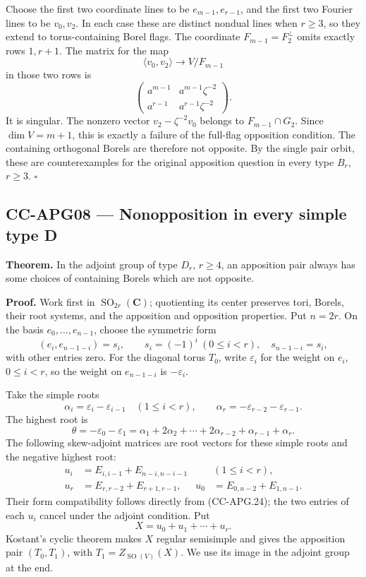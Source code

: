 \documentclass[11pt,a4paper]{article}
\theoremstyle{definition}\newtheorem{definition}[theorem]{Definition}
\theoremstyle{remark}\newtheorem{remark}[theorem]{Remark}
\begin{document}
Choose the first two coordinate lines to be \(e_{m-1},e_{r-1}\), and the
first two Fourier lines to be \(v_0,v_2\). In each case these are
distinct nondual lines when \(r\geq3\), so they extend to
torus-containing Borel flags. The coordinate \(F_{m-1}=F_2^\perp\) omits
exactly rows \(1,r+1\). The matrix for the map \[
 \langle v_0,v_2\rangle\longrightarrow V/F_{m-1}
\] in those two rows is \[
 \begin{pmatrix}
 a^{m-1}&a^{m-1}\zeta^{-2}\\
 a^{r-1}&a^{r-1}\zeta^{-2}
 \end{pmatrix}.
\] It is singular. The nonzero vector \(v_2-\zeta^{-2}v_0\) belongs to
\(F_{m-1}\cap G_2\). Since \(\dim V=m+1\), this is exactly a failure of
the full-flag opposition condition. The containing orthogonal Borels are
therefore not opposite. By the single pair orbit, these are
counterexamples for the original apposition question in every type
\(B_r\), \(r\geq3\). \(\square\)

\subsection{CC-APG08 --- Nonopposition in every simple type
D}\label{cc-apg08-nonopposition-in-every-simple-type-d}

\textbf{Theorem.} In the adjoint group of type \(D_r\), \(r\geq4\), an
apposition pair always has some choices of containing Borels which are
not opposite.

\textbf{Proof.} Work first in \(\operatorname{SO}_{2r}(\mathbf C)\);
quotienting its center preserves tori, Borels, their root systems, and
the apposition and opposition properties. Put \(n=2r\). On the basis
\(e_0,\ldots,e_{n-1}\), choose the symmetric form \[
 (e_i,e_{n-1-i})=s_i,\qquad
 s_i=(-1)^i\ (0\leq i<r),\quad
 s_{n-1-i}=s_i,
 \tag{CC-APG.24}
\] with other entries zero. For the diagonal torus \(T_0\), write
\(\varepsilon_i\) for the weight on \(e_i\), \(0\leq i<r\), so the
weight on \(e_{n-1-i}\) is \(-\varepsilon_i\).

Take the simple roots \[
 \alpha_i=\varepsilon_i-\varepsilon_{i-1}\quad(1\leq i<r),
 \qquad \alpha_r=-\varepsilon_{r-2}-\varepsilon_{r-1}.
\] The highest root is \[
 \theta=-\varepsilon_0-\varepsilon_1
 =\alpha_1+2\alpha_2+\cdots+2\alpha_{r-2}
    +\alpha_{r-1}+\alpha_r.
\] The following skew-adjoint matrices are root vectors for these simple
roots and the negative highest root: \[
\begin{aligned}
 u_i&=E_{i,i-1}+E_{n-i,n-i-1} &&(1\leq i<r),\\
 u_r&=E_{r,r-2}+E_{r+1,r-1},&
 u_0&=E_{0,n-2}+E_{1,n-1}.
\end{aligned}
\] Their form compatibility follows directly from (CC-APG.24); the two
entries of each \(u_i\) cancel under the adjoint condition. Put \[
 X=u_0+u_1+\cdots+u_r.
 \tag{CC-APG.25}
\] Kostant's cyclic theorem makes \(X\) regular semisimple and gives the
apposition pair \((T_0,T_1)\), with \(T_1=Z_{\operatorname{SO}(V)}(X)\).
We use its image in the adjoint group at the end.
\end{document}
